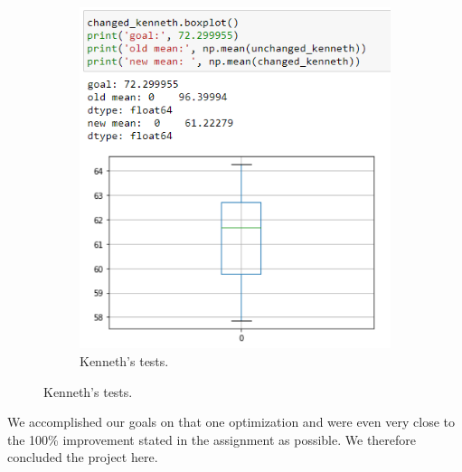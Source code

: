\documentclass[parskip=full]{scrartcl}
\begin{document}
\begin{figure}[!hb]
\begin{subfigure}[b]{0.35\textwidth}
    \end{subfigure}
    \begin{subfigure}[b]{0.35\textwidth}
        \caption{Kenneth's tests.} 
        \includegraphics[width=\textwidth]{kenneth_changed.PNG}
    \end{subfigure}
  \end{figure}

We accomplished our goals on that one optimization and were even very close to the 100\% improvement stated in the assignment as possible. We therefore concluded the project here.
\end{document}
